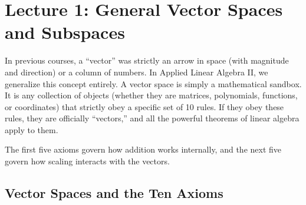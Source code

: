 \section{Lecture 1: General Vector Spaces and Subspaces}

\begin{intuition}
In previous courses, a ``vector'' was strictly an arrow in space (with magnitude and direction) or a column of numbers. In Applied Linear Algebra II, we generalize this concept entirely. A vector space is simply a mathematical sandbox. It is any collection of objects (whether they are matrices, polynomials, functions, or coordinates) that strictly obey a specific set of 10 rules. If they obey these rules, they are officially ``vectors,'' and all the powerful theorems of linear algebra apply to them.
\end{intuition}

The first five axioms govern how addition works internally, and the next five govern how scaling interacts with the vectors.

\subsection{Vector Spaces and the Ten Axioms}

